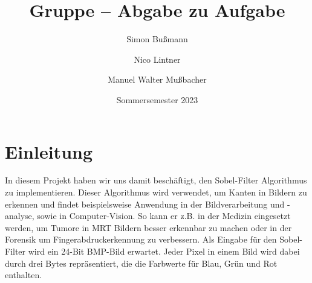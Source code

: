 \documentclass[course=erap]{aspdoc}
\author{Simon Bußmann \and Nico Lintner \and Manuel Walter Mußbacher}
\date{Sommersemester 2023}
\title{Gruppe \theGroup{} -- Abgabe zu Aufgabe \theNumber}
\begin{document}
\maketitle

\section{Einleitung}
In diesem Projekt haben wir uns damit beschäftigt, den Sobel-Filter Algorithmus zu implementieren.
Dieser Algorithmus wird verwendet, um Kanten in Bildern zu erkennen und findet beispielsweise Anwendung in der Bildverarbeitung und -analyse, sowie in Computer-Vision.
So kann er z.B. in der Medizin eingesetzt werden, um Tumore in MRT Bildern besser erkennbar zu machen \cite{7002427}
oder in der Forensik um Fingerabdruckerkennung zu verbessern. \cite{6900702}
Als Eingabe für den Sobel-Filter wird ein 24-Bit BMP-Bild erwartet.
Jeder Pixel in einem Bild wird dabei durch drei Bytes repräsentiert, die die Farbwerte für Blau, Grün und Rot enthalten.
\end{document}
